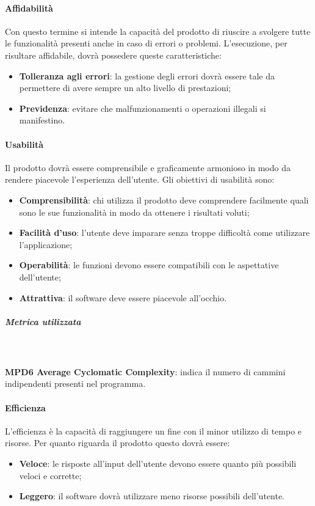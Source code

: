 \paragraph{Affidabilità}
Con questo termine si intende la capacità del prodotto di riuscire a svolgere tutte le funzionalità presenti anche in caso di errori o problemi. L'esecuzione, per risultare affidabile, dovrà possedere queste caratteristiche:
\begin{itemize}
\item \textbf{Tolleranza agli errori}: la gestione degli errori dovrà essere tale da permettere di avere sempre un alto livello di prestazioni;
\item \textbf{Previdenza}: evitare che malfunzionamenti o operazioni illegali si manifestino.
\end{itemize}
\paragraph{Usabilità}
Il prodotto dovrà essere comprensibile e graficamente armonioso in modo da rendere piacevole l'esperienza dell'utente. Gli obiettivi di usabilità sono:
\begin{itemize}
\item \textbf{Comprensibilità}: chi utilizza il prodotto deve comprendere facilmente quali sono le sue funzionalità in modo da ottenere i risultati voluti;
\item \textbf{Facilità d'uso}: l'utente deve imparare senza troppe difficoltà come utilizzare l'applicazione;
\item \textbf{Operabilità}: le funzioni devono essere compatibili con le aspettative dell'utente;
\item \textbf{Attrattiva}: il software deve essere piacevole all'occhio.
\end{itemize} 
\subparagraph{Metrica utilizzata}\mbox{}\\
\\
\textbf{MPD6 Average Cyclomatic Complexity}: indica il numero di cammini indipendenti presenti nel programma.
\paragraph{Efficienza}
L'efficienza è la capacità di raggiungere un fine con il minor utilizzo di tempo e risorse. Per quanto riguarda il prodotto questo dovrà essere:
\begin{itemize}
\item \textbf{Veloce}: le risposte all'input dell'utente devono essere quanto più possibili veloci e corrette;
\item \textbf{Leggero}: il software dovrà utilizzare meno risorse possibili dell'utente.
\end{itemize}
